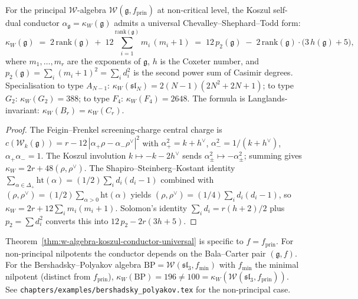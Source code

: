 \begin{theorem}
\label{thm:w-algebra-koszul-conductor-universal}
For the principal $\mathcal{W}$-algebra $\mathcal{W}(\mathfrak{g},
f_{\mathrm{prin}})$ at non-critical level, the Koszul self-dual
conductor $\alpha_{\mathfrak{g}} = \kappa_W(\mathfrak{g})$ admits a
universal Chevalley--Shephard--Todd form:
\[
 \kappa_W(\mathfrak{g})
 \;=\;
 2\,\mathrm{rank}(\mathfrak{g})
 \;+\;
 12 \sum_{i=1}^{\mathrm{rank}(\mathfrak{g})} m_i\,(m_i + 1)
 \;=\;
 12\,p_2(\mathfrak{g})
 \;-\;
 2\,\mathrm{rank}(\mathfrak{g})\cdot\bigl(3\,h(\mathfrak{g}) + 5\bigr),
\]
where $m_1, \ldots, m_r$ are the exponents of $\mathfrak{g}$, $h$ is
the Coxeter number, and $p_2(\mathfrak{g}) = \sum_i (m_i + 1)^2 =
\sum_i d_i^2$ is the second power sum of Casimir degrees.
Specialisation to type $A_{N-1}$:
$\kappa_W(\mathfrak{sl}_N) = 2(N-1)(2N^2 + 2N + 1)$; to type $G_2$:
$\kappa_W(G_2) = 388$; to type $F_4$: $\kappa_W(F_4) = 2648$. The
formula is Langlands-invariant: $\kappa_W(B_r) = \kappa_W(C_r)$.
\end{theorem}

\begin{proof}
The Feigin--Frenkel screening-charge central charge is $c(\mathcal{W}_k(\mathfrak{g})) = r - 12\,|\alpha_+\rho - \alpha_-\rho^\vee|^2$
with $\alpha_+^2 = k + h^\vee$, $\alpha_-^2 = 1/(k+h^\vee)$,
$\alpha_+\alpha_- = 1$. The Koszul involution
$k \mapsto -k - 2h^\vee$ sends $\alpha_\pm^2 \mapsto -\alpha_\pm^2$;
summing gives $\kappa_W = 2r + 48(\rho, \rho^\vee)$. The
Shapiro--Steinberg--Kostant identity
$\sum_{\alpha \in \Delta_+} \mathrm{ht}(\alpha) = (1/2) \sum_i d_i(d_i - 1)$
combined with $(\rho, \rho^\vee) = (1/2) \sum_{\alpha > 0}\mathrm{ht}(\alpha)$
yields $(\rho, \rho^\vee) = (1/4)\sum_i d_i(d_i - 1)$, so
$\kappa_W = 2r + 12\sum_i m_i(m_i + 1)$. Solomon's identity
$\sum_i d_i = r(h+2)/2$ plus $p_2 = \sum d_i^2$ converts this into
$12\,p_2 - 2r(3h+5)$.
\end{proof}

\begin{remark}
Theorem~\ref{thm:w-algebra-koszul-conductor-universal} is specific to
$f = f_{\mathrm{prin}}$. For non-principal nilpotents the conductor
depends on the Bala--Carter pair $(\mathfrak{g}, f)$. For the
Bershadsky--Polyakov algebra
$\mathrm{BP} = \mathcal{W}(\mathfrak{sl}_3, f_{\mathrm{min}})$ with
$f_{\mathrm{min}}$ the minimal nilpotent (distinct from
$f_{\mathrm{prin}}$), $\kappa_W(\mathrm{BP}) = 196 \ne 100 =
\kappa_W(\mathcal{W}(\mathfrak{sl}_3, f_{\mathrm{prin}}))$. See
\texttt{chapters/examples/bershadsky\_polyakov.tex} for the
non-principal case.
\end{remark}

